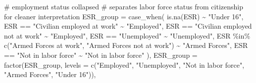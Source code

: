 \documentclass[
  letterpaper,
  DIV=11,
  numbers=noendperiod]{scrartcl}
\newenvironment{Shaded}{\begin{snugshade}}{\end{snugshade}}
\newcommand{\AttributeTok}[1]{\textcolor[rgb]{0.40,0.45,0.13}{#1}}
\newcommand{\CommentTok}[1]{\textcolor[rgb]{0.37,0.37,0.37}{#1}}
\newcommand{\FunctionTok}[1]{\textcolor[rgb]{0.28,0.35,0.67}{#1}}
\newcommand{\NormalTok}[1]{\textcolor[rgb]{0.00,0.23,0.31}{#1}}
\newcommand{\SpecialCharTok}[1]{\textcolor[rgb]{0.37,0.37,0.37}{#1}}
\newcommand{\StringTok}[1]{\textcolor[rgb]{0.13,0.47,0.30}{#1}}
\begin{document}
\begin{Shaded}
\begin{Highlighting}[]
    \CommentTok{\# employment status collapsed}
    \CommentTok{\# separates labor force status from citizenship for cleaner interpretation}
    \AttributeTok{ESR\_group =} \FunctionTok{case\_when}\NormalTok{(}
      \FunctionTok{is.na}\NormalTok{(ESR)                                          }\SpecialCharTok{\textasciitilde{}} \StringTok{"Under 16"}\NormalTok{,}
\NormalTok{      ESR }\SpecialCharTok{==} \StringTok{"Civilian employed at work"}                  \SpecialCharTok{\textasciitilde{}} \StringTok{"Employed"}\NormalTok{,}
\NormalTok{      ESR }\SpecialCharTok{==} \StringTok{"Civilian employed not at work"}              \SpecialCharTok{\textasciitilde{}} \StringTok{"Employed"}\NormalTok{,}
\NormalTok{      ESR }\SpecialCharTok{==} \StringTok{"Unemployed"}                                 \SpecialCharTok{\textasciitilde{}} \StringTok{"Unemployed"}\NormalTok{,}
\NormalTok{      ESR }\SpecialCharTok{\%in\%} \FunctionTok{c}\NormalTok{(}\StringTok{"Armed Forces at work"}\NormalTok{,}
                 \StringTok{"Armed Forces not at work"}\NormalTok{)              }\SpecialCharTok{\textasciitilde{}} \StringTok{"Armed Forces"}\NormalTok{,}
\NormalTok{      ESR }\SpecialCharTok{==} \StringTok{"Not in labor force"}                         \SpecialCharTok{\textasciitilde{}} \StringTok{"Not in labor force"}
\NormalTok{    ),}
    \AttributeTok{ESR\_group =} \FunctionTok{factor}\NormalTok{(ESR\_group,}
                       \AttributeTok{levels =} \FunctionTok{c}\NormalTok{(}\StringTok{"Employed"}\NormalTok{, }\StringTok{"Unemployed"}\NormalTok{,}
                                  \StringTok{"Not in labor force"}\NormalTok{, }\StringTok{"Armed Forces"}\NormalTok{,}
                                  \StringTok{"Under 16"}\NormalTok{)),}


\end{Highlighting}
\end{Shaded}
\end{document}
